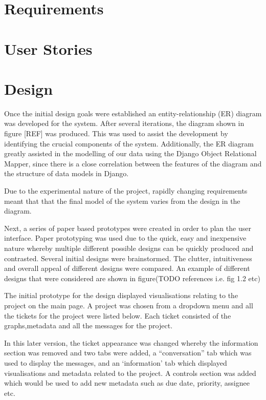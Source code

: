 \documentclass[a4paper]{l3proj}
\begin{document}
\section{Requirements}

\section{User Stories}

\section{Design}

Once the initial design goals were established an entity-relationship (ER) diagram was developed for the system. After several iterations, the diagram shown in figure [REF] was produced. This was used to assist the development by identifying the crucial components of the system. Additionally, the ER diagram greatly assisted in the modelling of our data using the Django Object Relational Mapper, since there is a close correlation between the features of the diagram and the structure of data models in Django. 

Due to the experimental nature of the project, rapidly changing requirements meant that that the final model of the system varies from the design in the diagram.

Next, a series of paper based prototypes were created in order to plan the user interface. Paper prototyping was used due to the quick, easy and inexpensive nature whereby multiple different possible designs can be quickly produced and contrasted. Several initial designs were brainstormed. The clutter, intuitiveness and overall appeal of different designs were compared.  An example of different designs that were considered are shown in figure(TODO references i.e. fig 1.2 etc)

The initial prototype for the design displayed visualisations relating to the project on the main page.  A project was chosen from a dropdown menu and all the tickets for the project were listed below.  Each ticket consisted of the graphs,metadata and all the messages for the project.

In this later version, the ticket appearance was changed whereby the information section was removed and two tabs were added, a ``conversation'' tab which was used to display the messages, and an ‘information’ tab which displayed visualisations and metadata related to the project.  A controls section was added which would be used to add new metadata such as due date, priority, assignee etc.
\end{document}
